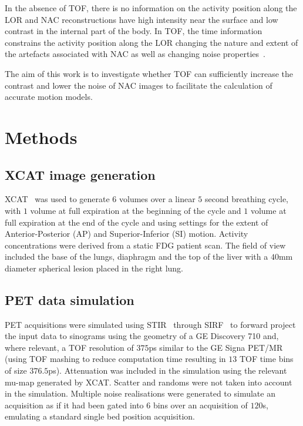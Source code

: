 \documentclass[10pt,twocolumn,twoside,letterpaper]{IEEEtran}
\begin{document}
In the absence of \gls{TOF}, there is no information on the activity position along the \gls{LOR} and \gls{NAC} reconstructions have high intensity near the surface and low contrast in the internal part of the body. In \gls{TOF}, the time information constrains the activity position along the \gls{LOR} changing the nature and extent of the artefacts associated with \gls{NAC} as well as changing noise properties~\cite{Ter-Pogossian1981}.

The aim of this work is to investigate whether \gls{TOF} can sufficiently increase the contrast and lower the noise of \gls{NAC} images to facilitate the calculation of accurate motion models.

\section{Methods}
\subsection{XCAT image generation}
\gls{XCAT}~\cite{Segars2010} was used to generate $6$ volumes over a linear $5$ second breathing cycle, with $1$ volume at full expiration at the beginning of the cycle and $1$ volume at full expiration at the end of the cycle and using settings for the extent of Anterior-Posterior (AP) and Superior-Inferior (SI) motion. Activity concentrations were derived from a static \gls{FDG} patient scan. The field of view included the base of the lungs, diaphragm and the top of the liver with a $40$mm diameter spherical lesion placed in the right lung.

\subsection{PET data simulation}
\gls{PET} acquisitions were simulated using \gls{STIR}~\cite{Thielemans2012,Efthimiou2018} through \gls{SIRF}~\cite{ovtchinnikov2019SIRFSynergisticImage,ovtchinnikov_evgueni_2019_3548719} to forward project the input data to sinograms using the geometry of a GE Discovery 710 and, where relevant, a \gls{TOF} resolution of $375$ps similar to the GE Signa PET/MR (using \gls{TOF} mashing to reduce computation time resulting in $13$ \gls{TOF} time bins of size $376.5$ps). Attenuation was included in the simulation using the relevant \gls{mu-map} generated by \gls{XCAT}. Scatter and randoms were not taken into account in the simulation. Multiple noise realisations were generated to simulate an acquisition as if it had been gated into $6$ bins over an acquisition of $120$s, emulating a standard single bed position acquisition. 
\end{document}
